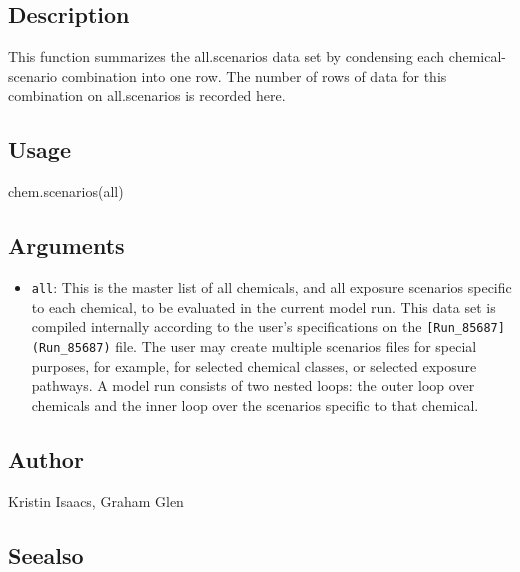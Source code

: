 \documentclass[
]{article}
\newenvironment{Shaded}{\begin{snugshade}}{\end{snugshade}}
\newcommand{\FunctionTok}[1]{\textcolor[rgb]{0.00,0.00,0.00}{#1}}
\newcommand{\NormalTok}[1]{#1}
\providecommand{\tightlist}{%
  \setlength{\itemsep}{0pt}\setlength{\parskip}{0pt}}
\begin{document}
\hypertarget{description-9}{%
\subsection{Description}\label{description-9}}

This function summarizes the all.scenarios data set by condensing each
chemical-scenario combination into one row. The number of rows of data
for this combination on all.scenarios is recorded here.

\hypertarget{usage-9}{%
\subsection{Usage}\label{usage-9}}

\begin{Shaded}
\begin{Highlighting}[]
\FunctionTok{chem.scenarios}\NormalTok{(all)}
\end{Highlighting}
\end{Shaded}

\hypertarget{arguments-6}{%
\subsection{Arguments}\label{arguments-6}}

\begin{itemize}
\tightlist
\item
  \texttt{all}: This is the master list of all chemicals, and all
  exposure scenarios specific to each chemical, to be evaluated in the
  current model run. This data set is compiled internally according to
  the user's specifications on the \texttt{{[}Run\_85687{]}(Run\_85687)}
  file. The user may create multiple scenarios files for special
  purposes, for example, for selected chemical classes, or selected
  exposure pathways. A model run consists of two nested loops: the outer
  loop over chemicals and the inner loop over the scenarios specific to
  that chemical.
\end{itemize}

\hypertarget{author-5}{%
\subsection{Author}\label{author-5}}

Kristin Isaacs, Graham Glen

\hypertarget{seealso-5}{%
\subsection{Seealso}\label{seealso-5}}
\end{document}

